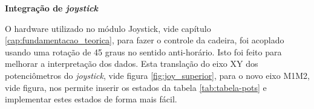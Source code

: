     \begin{table}[!ht]
    \centering
    \caption{Intensidade e direção dos motores conforme estado. Asteriscos simbolizam motor sem direção}
    \label{tab:tabela-pots2}
    \end{table}

    \textbf{Integração de \textit{joystick}}

    O hardware utilizado no módulo Joystick, vide capítulo \ref{cap:fundamentacao_teorica}, para fazer o controle da cadeira, foi acoplado usando uma rotação de 45 graus no sentido anti-horário. Isto foi feito para melhorar a interpretação dos dados. Esta translação do eixo XY dos potenciômetros do \textit{joystick}, vide figura \ref{fig:joy_superior}, para o novo eixo M1M2, vide figura, nos permite inserir os estados da tabela \ref{tab:tabela-pots} e implementar estes estados de forma mais fácil.


